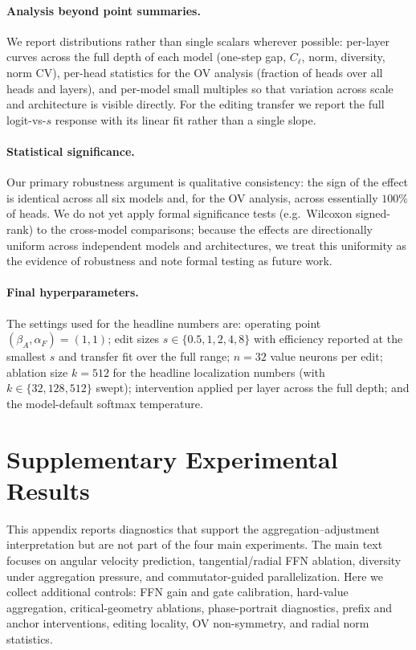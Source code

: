 \documentclass[11pt]{article}
\begin{document}
\paragraph{Analysis beyond point summaries.}
We report distributions rather than single scalars wherever possible: per-layer
curves across the full depth of each model (one-step gap, $C_\ell$, norm, diversity,
norm CV), per-head statistics for the OV analysis (fraction of heads over all heads
and layers), and per-model small multiples so that variation across scale and
architecture is visible directly. For the editing transfer we report the full
logit-vs-$s$ response with its linear fit rather than a single slope.

\paragraph{Statistical significance.}
Our primary robustness argument is qualitative consistency: the sign of the effect is
identical across all six models and, for the OV analysis, across essentially $100\%$
of heads. We do not yet apply formal significance tests (e.g.\ Wilcoxon signed-rank)
to the cross-model comparisons; because the effects are directionally uniform across
independent models and architectures, we treat this uniformity as the evidence of
robustness and note formal testing as future work.

\paragraph{Final hyperparameters.}
The settings used for the headline numbers are: operating point
$(\beta_A,\alpha_F)=(1,1)$; edit sizes $s\in\{0.5,1,2,4,8\}$ with efficiency reported
at the smallest $s$ and transfer fit over the full range; $n=32$ value neurons per
edit; ablation size $k=512$ for the headline localization numbers (with $k\in\{32,128,512\}$
swept); intervention applied per layer across the full depth; and the model-default
softmax temperature.

\section{Supplementary Experimental Results}\label{app:diagnostics}\label{app:supplementary-results}
This appendix reports diagnostics that support the aggregation--adjustment
interpretation but are not part of the four main experiments.  The main text
focuses on angular velocity prediction, tangential/radial FFN ablation,
diversity under aggregation pressure, and commutator-guided parallelization.
Here we collect additional controls: FFN gain and gate calibration, hard-value
aggregation, critical-geometry ablations, phase-portrait diagnostics, prefix and
anchor interventions, editing locality, OV non-symmetry, and radial norm
statistics.
\end{document}
